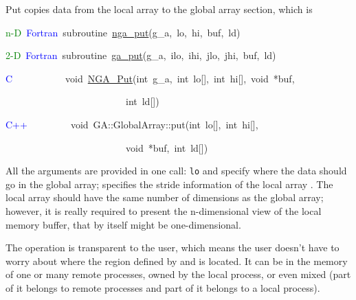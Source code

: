 Put copies data from the local array to the global array section,
which is
\begin{lyxcode}
\textcolor{green}{n-D}~\textcolor{blue}{Fortran}~subroutine~\href{http://www.emsl.pnl.gov/docs/global/ga_ops.html\#ga_put}{nga\_{}put}(g\_a,~lo,~hi,~buf,~ld)~

\textcolor{green}{2-D}~\textcolor{blue}{Fortran}~subroutine~\href{http://www.emsl.pnl.gov/docs/global/ga_ops.html\#ga_put}{ga\_{}put}(g\_a,~ilo,~ihi,~jlo,~jhi,~buf,~ld)~

\textcolor{blue}{C}~~~~~~~~~~~void~\href{http://www.emsl.pnl.gov/docs/global/c_nga_ops.html\#ga_put}{NGA\_{}Put}(int~g\_a,~int~lo{[}{]},~int~hi{[}{]},~void~{*}buf,~

~~~~~~~~~~~~~~~~~~~~~~~~~int~ld{[}{]})~

\textcolor{blue}{C++}~~~~~~~~~void~GA::GlobalArray::put(int~lo{[}{]},~int~hi{[}{]},~

~~~~~~~~~~~~~~~~~~~~~~~~~void~{*}buf,~int~ld{[}{]})
\end{lyxcode}
All the arguments are provided in one call: \texttt{lo} and \texttt{}
specify where the data should go in the global array; \texttt{}
specifies the stride information of the local array \texttt{}.
The local array should have the same number of dimensions as the global
array; however, it is really required to present the n-dimensional
view of the local memory buffer, that by itself might be one-dimensional.

The operation is transparent to the user, which means the user doesn't
have to worry about where the region defined by \texttt{}
and \texttt{} is located. It can be in the memory of one
or many remote processes, owned by the local process, or even mixed
(part of it belongs to remote processes and part of it belongs to
a local process).


